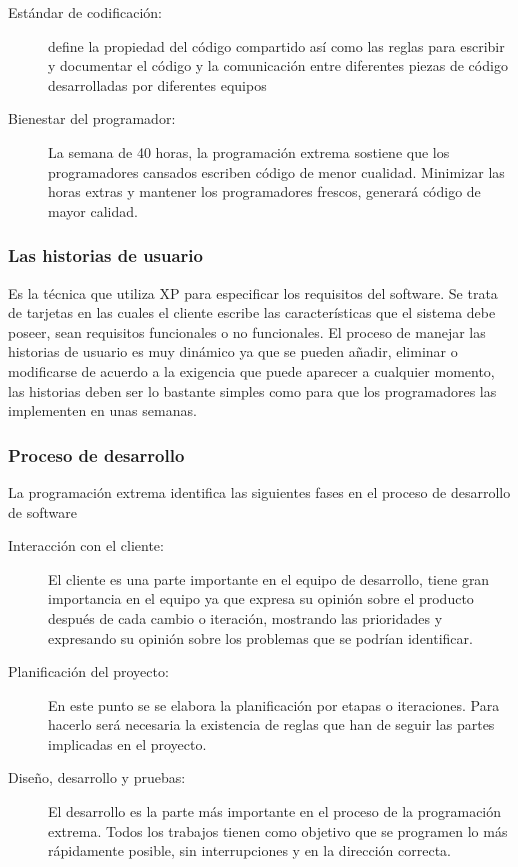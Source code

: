 \begin{description}
        \item[Estándar de codificación:] define la propiedad del código compartido así como las reglas para escribir y documentar el código y la comunicación entre diferentes piezas de código desarrolladas por diferentes equipos

        \item[Bienestar del programador:] La semana de 40 horas, la programación extrema sostiene que los programadores cansados escriben código de menor cualidad. Minimizar las horas extras y mantener los programadores frescos, generará código de mayor calidad.

      \end{description}


      \subsubsection{Las historias de usuario}
      \label{subs:user_story}


      Es la técnica que utiliza XP para especificar los requisitos del software. Se trata de tarjetas en las cuales el cliente escribe las características que el sistema debe poseer, sean requisitos funcionales o no funcionales. El proceso de manejar las historias de usuario es muy dinámico ya que se pueden añadir, eliminar o modificarse de acuerdo a la exigencia que puede aparecer a cualquier momento, las historias deben ser lo bastante simples como para que los programadores las implementen en unas semanas.\cite{xpesp}

      \subsubsection{Proceso de desarrollo}
      \label{subs:proceso_desarollo}

      La programación extrema identifica las siguientes fases en el proceso de desarrollo de software

      \begin{description}
        \item[Interacción con el cliente:]
        El cliente es una parte importante en el equipo de desarrollo, tiene gran importancia en el equipo ya que expresa su opinión sobre el producto después de cada cambio o iteración, mostrando las prioridades y expresando su opinión sobre los problemas que se podrían identificar.

        \item[Planificación del proyecto:]
        En este punto se se elabora la planificación por etapas o iteraciones. Para hacerlo será necesaria la existencia de reglas que han de seguir las partes implicadas en el proyecto.

        \item[Diseño, desarrollo y pruebas:]
        El desarrollo es la parte más importante en el proceso de la programación extrema. Todos los trabajos tienen como objetivo que se programen lo más rápidamente posible, sin interrupciones y en la dirección correcta.\cite{xpesp}

      \end{description}


